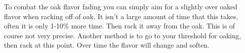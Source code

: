   To combat the oak flavor fading you can simply aim for a slightly over oaked flavor when racking off of oak. It
  isn't a large amount of time that this takes, often it is only 1-10\% more time. Then rack it away from the oak. 
  This is of course not very precise. Another method is to go to your threshold for oaking, then rack at this point.
  Over time the flavor will change and soften.

